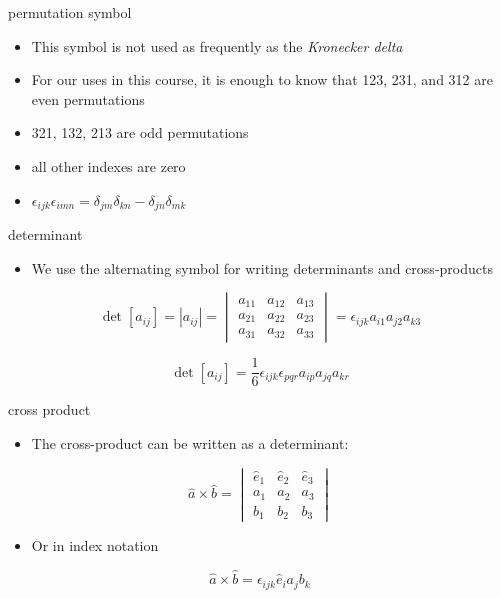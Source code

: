 \documentclass[
  letterpaper,
  ignorenonframetext,
  aspectratio=43,
  handout,
  12pt]{beamer}
\providecommand{\tightlist}{%
  \setlength{\itemsep}{0pt}\setlength{\parskip}{0pt}}
\providecommand{\tightlist}{%
\setlength{\itemsep}{0pt}\setlength{\parskip}{0pt}}
\begin{document}
\begin{frame}{permutation symbol}
\protect\hypertarget{permutation-symbol}{}
\begin{itemize}
\tightlist
\item
  This symbol is not used as frequently as the \emph{Kronecker delta}
\item
  For our uses in this course, it is enough to know that 123, 231, and
  312 are even permutations
\item
  321, 132, 213 are odd permutations
\item
  all other indexes are zero
\item
  \(\epsilon_{ijk}\epsilon_{imn} = \delta_{jm} \delta_{kn} - \delta_{jn}\delta_{mk}\)
\end{itemize}
\end{frame}

\begin{frame}{determinant}
\protect\hypertarget{determinant}{}
\begin{itemize}
\tightlist
\item
  We use the alternating symbol for writing determinants and
  cross-products
\end{itemize}

\[\det[a_{ij}] = |a_{ij}| = \begin{vmatrix}
a_{11} & a_{12} & a_{13}\\
a_{21} & a_{22} & a_{23}\\
a_{31} & a_{32} & a_{33}
\end{vmatrix}
= \epsilon_{ijk}a_{i1} a_{j2} a_{k3}\]

\[\det[a_{ij}] = \frac{1}{6}\epsilon_{ijk} \epsilon_{pqr}a_{ip}a_{jq}a_{kr}\]
\end{frame}

\begin{frame}{cross product}
\protect\hypertarget{cross-product}{}
\begin{itemize}
\tightlist
\item
  The cross-product can be written as a determinant:
\end{itemize}

\[\hat{a} \times \hat{b} = \begin{vmatrix}
\hat{e}_1 & \hat{e}_2 & \hat{e}_3\\
a_1 & a_2 & a_3 \\
b_1 & b_2 & b_3
\end{vmatrix}\]

\begin{itemize}
\tightlist
\item
  Or in index notation
\end{itemize}

\[\hat{a} \times \hat{b} = \epsilon_{ijk} \hat{e}_i a_j b_k \]
\end{frame}
\end{document}
